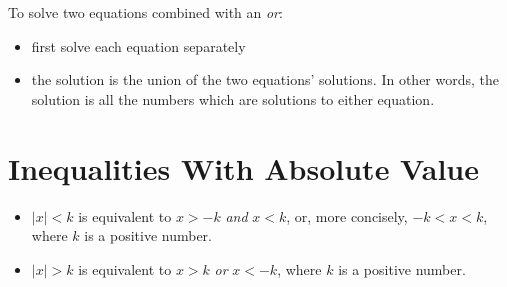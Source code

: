 \documentclass[fleqn]{article}
\begin{document}
To solve two equations combined with an {\em or}:
\begin{itemize}
  \item first solve each equation separately
  \item the solution is the union of the two equations' solutions.  In other words, the solution is all the numbers which are
    solutions to either equation.
\end{itemize}

\section{Inequalities With Absolute Value}

\begin{itemize}
  \item \( |x| < k \) is equivalent to $x > -k$ {\em and} $x < k$, or, more concisely, $-k < x < k$, where $k$ is a positive number.
  \item \( |x| > k \) is equivalent to $x > k$ {\em or} $x < -k$, where $k$ is a positive number.
\end{itemize}
\end{document}
